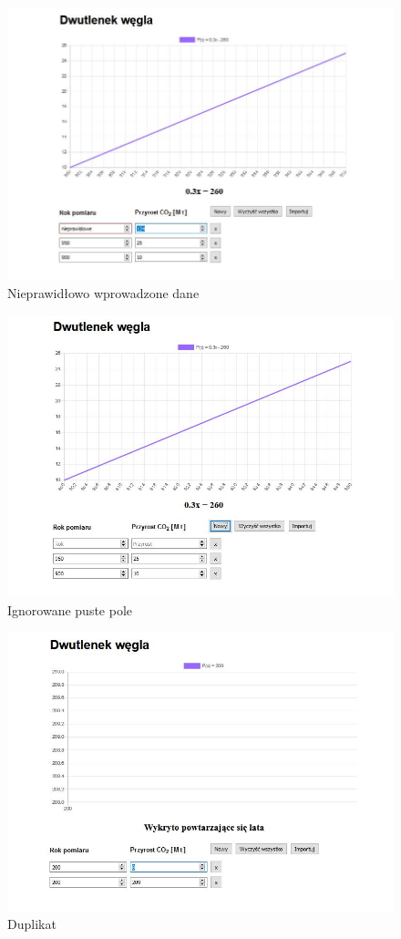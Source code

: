 \documentclass[12pt]{article}
\begin{document}
\begin{figure}
\centering
\includegraphics[scale=0.65]{wrongInput.jpg}
\caption{Nieprawidłowo wprowadzone dane}
\end{figure}
\begin{figure}
\centering
\includegraphics[scale=0.65]{emptyInput.jpg}
\caption{Ignorowane puste pole}
\end{figure}

\begin{figure}
\centering
\includegraphics[scale=0.65]{duplicate.jpg}
\caption{Duplikat}
\end{figure}
\end{document}
